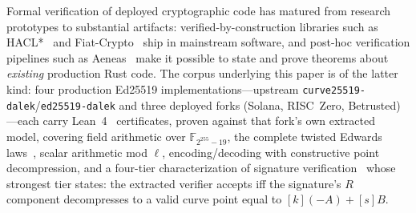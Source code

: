 \documentclass[10pt,twocolumn]{article}
\newcommand{\code}[1]{\texttt{\small #1}}
\begin{document}
Formal verification of deployed cryptographic code has matured from
research prototypes to substantial artifacts: verified-by-construction
libraries such as HACL*~\cite{hacl} and Fiat-Crypto~\cite{fiatcrypto}
ship in mainstream software, and post-hoc verification pipelines such as
Aeneas~\cite{aeneas} make it possible to state and prove theorems about
\emph{existing} production Rust code. The corpus underlying this paper
is of the latter kind: four production Ed25519
implementations---upstream \code{curve25519-dalek}/\code{ed25519-dalek}
and three deployed forks (Solana, RISC~Zero, Betrusted)---each carry
Lean~4~\cite{lean4} certificates, proven against that fork's own
extracted model, covering field arithmetic over $\mathbb{F}_{2^{255}-19}$,
the complete twisted Edwards laws~\cite{bernsteinlange,twisted}, scalar
arithmetic mod $\ell$, encoding/decoding with constructive point
decompression, and a four-tier characterization of signature
verification~\cite{ed25519,rfc8032} whose strongest tier states: the
extracted verifier accepts iff the signature's $R$ component decompresses
to a valid curve point equal to $[k](-A)+[s]B$.
\end{document}

